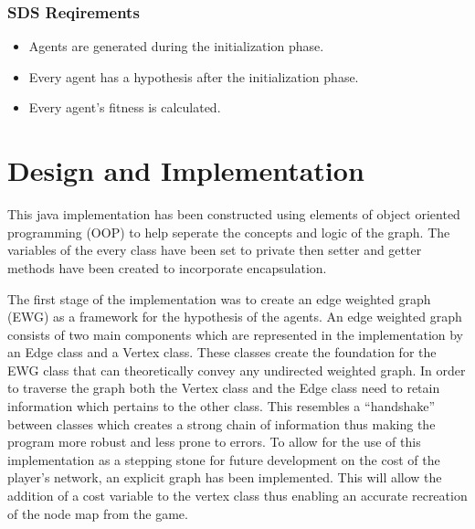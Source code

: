\documentclass{AISB2008}
\begin{document}
\subsubsection{SDS Reqirements}

\begin{itemize}
\item Agents are generated during the initialization phase.
\item Every agent has a hypothesis after the initialization phase.
\item Every agent’s fitness is calculated.
\end{itemize}


\section{Design and Implementation}

This java implementation has been constructed using elements of object oriented programming (OOP) to help seperate the concepts and logic of the graph. The variables of the every class have been set to private then setter and getter methods have been created to incorporate encapsulation.

The first stage of the implementation was to create an edge weighted graph (EWG) as a framework for the hypothesis of the agents. An edge weighted graph consists of two main components which are represented in the implementation by an Edge class and a Vertex class.  These classes create the foundation for the EWG class that can theoretically convey any undirected weighted graph. In order to traverse the graph both the Vertex class and the Edge class need to retain information which pertains to the other class. This resembles a “handshake” between classes which creates a strong chain of information thus making the program more robust and less prone to errors. To allow for the use of this implementation as a stepping stone for future development on the cost of the player’s network, an explicit graph has been implemented. This will allow the addition of a cost variable to the vertex class thus enabling an accurate recreation of the node map from the game.
\end{document}
